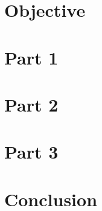 \documentclass{article}
\begin{document}
\begin{titlepage}

\end{titlepage}
\section{Objective}

\section{Part 1}

\section{Part 2}

\section{Part 3}

\section{Conclusion}

\end{document}
